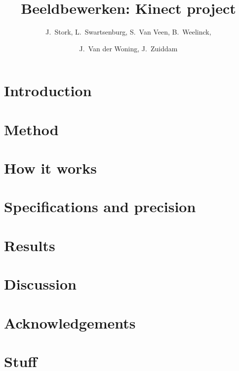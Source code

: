 \documentclass{scrreprt}
\title{
  Beeldbewerken: Kinect project
}
\author{
  J.\ Stork, L.\ Swartsenburg,  S.\ Van Veen, B.\ Weelinck,\and J.\ Van der Woning, J.\ Zuiddam 
} %
\begin{document}
\maketitle
\tableofcontents

\chapter{Introduction}\label{ch:introduction}
    


\chapter{Method} 
\label{ch:method}
    


\chapter{How it works}
\label{ch:howitworks}
    


\chapter{Specifications and precision}
\label{ch:howitworks}
    


\chapter{Results} 
\label{ch:results}
    


\chapter{Discussion} 
\label{ch:discussion}
    


\chapter{Acknowledgements} 
\label{ch:discussion}
    


\appendix

\chapter{Stuff} 
\label{ch:appendixA}
    
\end{document}
